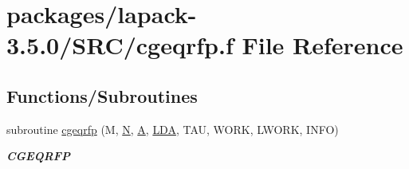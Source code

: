 \hypertarget{cgeqrfp_8f}{}\section{packages/lapack-\/3.5.0/\+S\+R\+C/cgeqrfp.f File Reference}
\label{cgeqrfp_8f}
\subsection*{Functions/\+Subroutines}
\begin{DoxyCompactItemize}
\item 
subroutine \hyperlink{group__complexGEcomputational_ga815fb74daf0dc3255daaca1070171301}{cgeqrfp} (M, \hyperlink{polmisc_8c_a0240ac851181b84ac374872dc5434ee4}{N}, \hyperlink{classA}{A}, \hyperlink{example__user_8c_ae946da542ce0db94dced19b2ecefd1aa}{L\+D\+A}, T\+A\+U, W\+O\+R\+K, L\+W\+O\+R\+K, I\+N\+F\+O)
\begin{DoxyCompactList}\small\item\em {\bfseries C\+G\+E\+Q\+R\+F\+P} \end{DoxyCompactList}\end{DoxyCompactItemize}
